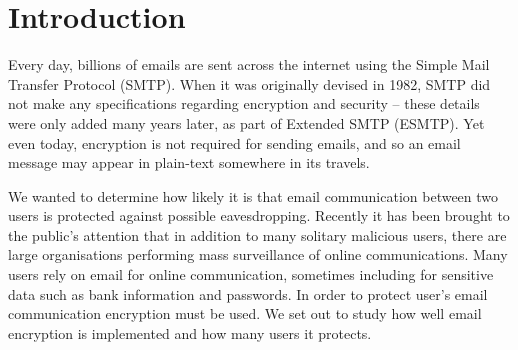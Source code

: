 \section{Introduction}
Every day, billions of emails are sent across the internet using the Simple Mail
Transfer Protocol (SMTP).  When it was originally devised in 1982, SMTP did not
make any specifications regarding encryption and security -- these details were
only added many years later, as part of Extended SMTP (ESMTP).  Yet even today,
encryption is not required for sending emails, and so an email message may
appear in plain-text somewhere in its travels.

We wanted to determine how likely it is that email communication between two 
users is protected against possible eavesdropping.  Recently it has been brought 
to the public’s attention that in addition to many solitary malicious users, 
there are large organisations performing mass surveillance of online 
communications. Many users rely on email for online communication, sometimes 
including for sensitive data such as bank information and passwords. In order 
to protect user's email communication encryption must be used. We set out to 
study how well email encryption is implemented and how many users it protects.

